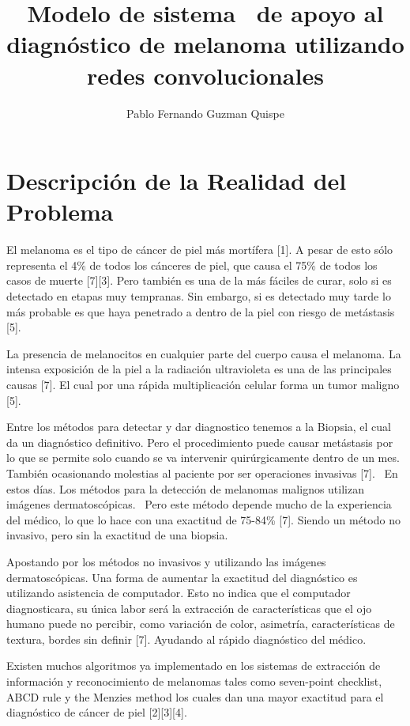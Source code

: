 \documentclass[a4paper]{article}
\title{Modelo de sistema  de apoyo al diagnóstico de melanoma utilizando redes convolucionales}
\author{Pablo Fernando Guzman Quispe}
\begin{document}
\maketitle
\section{Descripción de la Realidad del Problema}

El melanoma es el tipo de cáncer de piel más mortífera [1]. A pesar de esto sólo representa el 4\% de todos los cánceres de piel, que causa el 75\% de todos los casos de muerte [7][3]. Pero también es una de la más fáciles de curar, solo si es detectado en etapas muy tempranas. Sin embargo, si es detectado muy tarde lo más probable es que haya penetrado a dentro de la piel con riesgo de metástasis [5]. 

La presencia de melanocitos en cualquier parte del cuerpo causa el melanoma. La intensa exposición de la piel a la radiación ultravioleta es una de las principales causas [7]. El cual por una rápida multiplicación celular forma un tumor maligno [5]. 

Entre los métodos para detectar y dar diagnostico tenemos a la Biopsia, el cual da un diagnóstico definitivo. Pero el procedimiento puede causar metástasis por lo que se permite solo cuando se va intervenir quirúrgicamente dentro de un mes. También ocasionando molestias al paciente por ser operaciones invasivas [7].  En estos días. Los métodos para la detección de melanomas malignos utilizan imágenes dermatoscópicas.  Pero este método depende mucho de la experiencia del médico, lo que lo hace con una exactitud de 75-84\% [7]. Siendo un método no invasivo, pero sin la exactitud de una biopsia.

Apostando por los métodos no invasivos y utilizando las imágenes dermatoscópicas. Una forma de aumentar la exactitud del diagnóstico es utilizando asistencia de computador. Esto no indica que el computador diagnosticara, su única labor será la extracción de características que el ojo humano puede no percibir, como variación de color, asimetría, características de textura, bordes sin definir [7]. Ayudando al rápido diagnóstico del médico.

Existen muchos algoritmos ya implementado en los sistemas de extracción de información y reconocimiento de melanomas tales como seven-point checklist, ABCD rule y the Menzies method los cuales dan una mayor exactitud para el diagnóstico de cáncer de piel [2][3][4]. 
\end{document}
